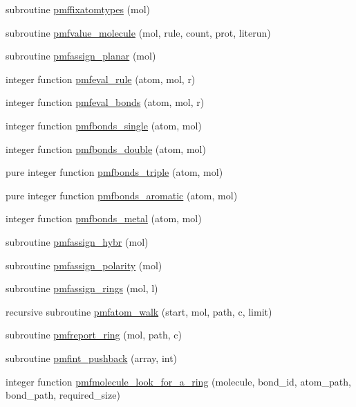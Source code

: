 \begin{DoxyCompactItemize}
\item 
subroutine \hyperlink{classcalc__pmf_a7690ff75f872de2ec10eb6d0231a402e}{pmffixatomtypes} (mol)
\item 
subroutine \hyperlink{classcalc__pmf_ac556c87ce39732c2e96def3d32dd211f}{pmfvalue\-\_\-molecule} (mol, rule, count, prot, literun)
\item 
subroutine \hyperlink{classcalc__pmf_a5312c91d4aaffe8b997730d4f2b6bf67}{pmfassign\-\_\-planar} (mol)
\item 
integer function \hyperlink{classcalc__pmf_ab174c72c67e0d863a402fd35c3c083be}{pmfeval\-\_\-rule} (atom, mol, r)
\item 
integer function \hyperlink{classcalc__pmf_a70b4bda6690c31f306f3841ace5eb2e4}{pmfeval\-\_\-bonds} (atom, mol, r)
\item 
integer function \hyperlink{classcalc__pmf_a60792ec7446f87ede4b5d34f2bb3b35c}{pmfbonds\-\_\-single} (atom, mol)
\item 
integer function \hyperlink{classcalc__pmf_ab5af37caedbaef9bae2a639745b82dfe}{pmfbonds\-\_\-double} (atom, mol)
\item 
pure integer function \hyperlink{classcalc__pmf_ac419e2969eb5c9bf7a36e28e6de79b12}{pmfbonds\-\_\-triple} (atom, mol)
\item 
pure integer function \hyperlink{classcalc__pmf_a3a26d68dccac11776fd3234d355b3213}{pmfbonds\-\_\-aromatic} (atom, mol)
\item 
integer function \hyperlink{classcalc__pmf_a5b2a0e542a5fd171c78c65065016c5fe}{pmfbonds\-\_\-metal} (atom, mol)
\item 
subroutine \hyperlink{classcalc__pmf_a1f22c5c87d8bdca9659e26942dc01ba8}{pmfassign\-\_\-hybr} (mol)
\item 
subroutine \hyperlink{classcalc__pmf_af7f277bf29989d0bfd7312561025f894}{pmfassign\-\_\-polarity} (mol)
\item 
subroutine \hyperlink{classcalc__pmf_a75f05266f8b9955425ea1f6b730cf820}{pmfassign\-\_\-rings} (mol, l)
\item 
recursive subroutine \hyperlink{classcalc__pmf_a589d5b6b9d660657938509169a92ac1c}{pmfatom\-\_\-walk} (start, mol, path, c, limit)
\item 
subroutine \hyperlink{classcalc__pmf_a76cde5345e2a89aa59e0c6aea4555112}{pmfreport\-\_\-ring} (mol, path, c)
\item 
subroutine \hyperlink{classcalc__pmf_ab9162aa7283d2b89563977445c48d42e}{pmfint\-\_\-pushback} (array, int)
\item 
integer function \hyperlink{classcalc__pmf_a6a8fb6accff9a1c234e056e69cdb12e8}{pmfmolecule\-\_\-look\-\_\-for\-\_\-a\-\_\-ring} (molecule, bond\-\_\-id, atom\-\_\-path, bond\-\_\-path, required\-\_\-size)

\end{DoxyCompactItemize}
